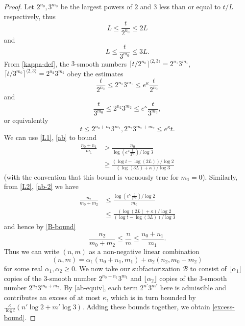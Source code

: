 \documentclass[12pt,a4paper,reqno]{amsart}
\numberwithin{equation}{section}
\theoremstyle{plain}
\theoremstyle{definition}
\newcommand\tuple{{\mathcal B}}
\begin{document}
  \begin{proof}  Let $2^{n_0}, 3^{m_0}$ be the largest powers of $2$ and $3$ less than or equal to $t/L$ respectively, thus
  \begin{equation}\label{L1}
   L \leq \frac{t}{2^{n_0}} \leq 2L
  \end{equation}
    and
    \begin{equation}\label{L2}  L \leq \frac{t}{3^{m_0}} \leq 3L. \end{equation}
  From \eqref{kappa-def}, the $3$-smooth numbers $\lceil t/2^{n_0} \rceil^{\langle 2,3 \rangle} = 2^{n_1} 3^{m_1} $, $\lceil t/3^{m_0} \rceil^{\langle 2,3 \rangle} = 2^{n_2} 3^{m_2}$ obey the estimates
  \begin{equation}\label{ab} 
    \frac{t}{2^{n_0}} \leq 2^{n_1} 3^{m_1} \leq e^{\kappa} \frac{t}{2^{n_0}}
  \end{equation}
  and
  \begin{equation}\label{ab-2}
   \frac{t}{3^{m_0}} \leq 2^{n_2} 3^{m_2} \leq e^{\kappa} \frac{t}{3^{m_0}},
  \end{equation}
  or equivalently
  \begin{equation}\label{ab-equiv} 
    t \leq 2^{n_0+n_1} 3^{m_1}, 2^{n_2} 3^{m_0+m_2} \leq e^{\kappa} t.
  \end{equation}
  We can use \eqref{L1}, \eqref{ab} to bound
  \begin{align*}
    \frac{n_0 + n_1}{m_1} &\geq \frac{n_0}{\log (e^{\kappa} \frac{t}{2^{n_0}}) / \log 3} \\
    &\geq \frac{(\log t - \log(2L)) / \log 2}{ (\log(3L)+\kappa) / \log 3 }
  \end{align*}
  (with the convention that this bound is vacuously true for $m_1=0$). Similarly, from \eqref{L2}, \eqref{ab-2} we have
  \begin{align*}
    \frac{n_2}{m_0+m_2} &\leq \frac{\log(e^\kappa \frac{t}{3^{m_0}}) / \log 2}{m_0} \\
    &\leq \frac{(\log(2L)+\kappa)/\log 2}{(\log t-\log(3L))/\log 3}
  \end{align*}
  and hence by \eqref{B-bound}
  \begin{equation}\label{m-wedge} \frac{n_2}{m_0+m_2} \leq \frac{n}{m} \leq \frac{n_0+n_1}{m_1}.
  \end{equation}
  Thus we can write $(n,m)$ as a non-negative linear combination
  $$ (n,m) = \alpha_1 (n_0+n_1,m_1) + \alpha_2 (n_2,m_0+m_2)$$
  for some real $\alpha_1, \alpha_2 \geq 0$. We now take our subfactorization $\tuple$ to consist of $\lfloor \alpha_1 \rfloor$ copies of the $3$-smooth number $2^{n_0+n_1} 3^{m_1}$ and $\lfloor \alpha_2 \rfloor$ copies of the $3$-smooth number $2^{n_2} 3^{m_0+m_2}$.  By \eqref{ab-equiv}, each term $2^{n'} 3^{m'}$ here is admissible and contributes an excess of at most $\kappa$, which is in turn bounded by $\frac{\kappa}{\log t} (n' \log 2 + m' \log 3)$.  Adding these bounds together, we obtain \eqref{excess-bound}.
  

\end{proof}
\end{document}

